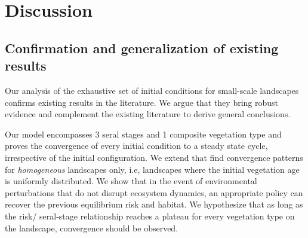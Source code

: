 

\section{Discussion}
\label{section:discussion}

\subsection{Confirmation and generalization of existing results}
Our analysis of the exhaustive set of initial conditions for small-scale landscapes confirms existing results in the literature. We argue that they bring robust evidence and complement the existing literature to derive general conclusions. 

Our model encompasses 3 seral stages and 1 composite vegetation type and proves the convergence of every initial condition to a steady state cycle, irrespective of the initial configuration. We extend \cite{minas_spatial_2014} that find convergence patterns for \textit{homogeneous} landscapes only, i.e, landscapes where the initial vegetation age is uniformly distributed.  We show that in the event of environmental perturbations that do not disrupt ecosystem dynamics, an appropriate policy can recover the previous equilibrium risk and habitat.
We hypothesize that as long as the risk/ seral-stage relationship reaches a plateau for every vegetation type on the landscape, convergence should be observed.

